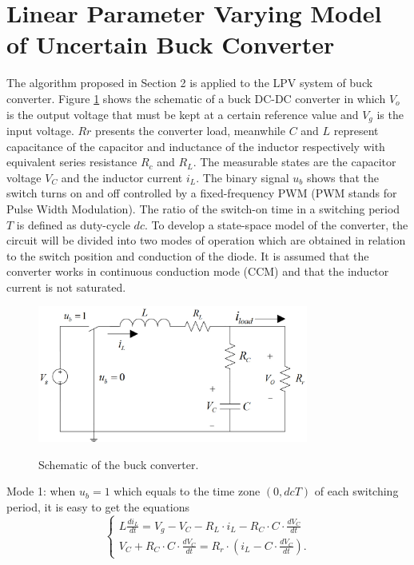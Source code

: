 \documentclass[journal]{IEEEtran}
\begin{document}
\section{Linear Parameter Varying Model of Uncertain Buck Converter}\label{sec:FDR}
The algorithm proposed in Section 2 is applied to the LPV system of buck converter. Figure \ref{fig:schematic1} shows the schematic of a buck DC-DC converter in which $V_o$ is the output voltage that must be kept at a certain reference value and $V_g$ is the input voltage. $Rr$ presents the converter load, meanwhile $C$ and $L$ represent capacitance of the capacitor and inductance of the inductor respectively with equivalent series resistance $R_c$ and $R_L$. The measurable states are the capacitor voltage $V_C$ and the inductor current $i_L$. The binary signal $u_b$ shows that the switch turns on and off controlled by a fixed-frequency PWM (PWM stands for Pulse Width Modulation). The ratio of the switch-on time in a switching period $T$ is defined as duty-cycle $dc$. To develop a state-space model of the converter, the circuit will be divided into two modes of operation which are obtained in relation to the switch position and conduction of the diode. It is assumed that the converter works in continuous conduction mode (CCM) and that the inductor current is not saturated.
\begin{figure}[htbp]
	\centering
		\includegraphics[width=3.5in]{picture/struck.jpg}\\
		\caption{Schematic of the buck converter.}\label{fig:schematic1}
	
\end{figure}

Mode 1: when $u_b=1$ which equals to the time zone $(0,dcT)$ of each switching period, it is easy to get the equations
\begin{equation}\label{onkvl}
\left\{ \begin{array}{l}
L\frac{{d{i_L}}}{{dt}} = {V_g} - {V_C} - {R_L} \cdot {i_L} - {R_C} \cdot C \cdot \frac{{d{V_C}}}{{dt}}\\
{V_C} + {R_C} \cdot C \cdot \frac{{d{V_C}}}{{dt}} = R_r \cdot \left( {{i_L} - C \cdot \frac{{d{V_C}}}{{dt}}} \right).
\end{array} \right.
\end{equation}
\end{document}
